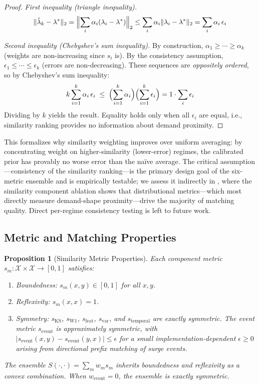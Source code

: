 \documentclass[conference,10pt]{IEEEtran}
\newtheorem{proposition}[theorem]{Proposition}
\begin{document}
\begin{proof}
\emph{First inequality (triangle inequality).}
\[
  \|\hat{\lambda}_k - \lambda^*\|_2
  = \Bigl\|\sum_{i} \alpha_i (\lambda_i - \lambda^*)\Bigr\|_2
  \leq \sum_{i} \alpha_i \|\lambda_i - \lambda^*\|_2
  = \sum_{i} \alpha_i \, \epsilon_i
\]

\emph{Second inequality (Chebyshev's sum inequality).}
By construction, $\alpha_1 \geq \cdots \geq \alpha_k$ (weights are
non-increasing since $s_i$ is). By the consistency assumption,
$\epsilon_1 \leq \cdots \leq \epsilon_k$ (errors are non-decreasing).
These sequences are \emph{oppositely ordered}, so by Chebyshev's sum
inequality:
\[
  k \sum_{i=1}^{k} \alpha_i \, \epsilon_i
  \;\leq\; \Bigl(\sum_{i=1}^{k} \alpha_i\Bigr)
           \Bigl(\sum_{i=1}^{k} \epsilon_i\Bigr)
  = 1 \cdot \sum_{i} \epsilon_i
\]
Dividing by $k$ yields the result. Equality holds only when all
$\epsilon_i$ are equal, i.e., similarity ranking provides no information
about demand proximity.
\end{proof}

This formalizes why similarity weighting improves over uniform averaging:
by concentrating weight on higher-similarity (lower-error) regimes, the
calibrated prior has provably no worse error than the na\"ive average.
The critical assumption---consistency of the similarity ranking---is the
primary design goal of the six-metric ensemble and is empirically
testable; we assess it indirectly in , where the
similarity component ablation shows that distributional metrics---which
most directly measure demand-shape proximity---drive the majority of
matching quality. Direct per-regime consistency testing is left to
future work.

\subsection{Metric and Matching Properties}

\begin{proposition}[Similarity Metric Properties]
\label{prop:metric_bounds}
Each component metric $s_m : \mathcal{X} \times \mathcal{X} \to [0, 1]$
satisfies:
\begin{enumerate}
  \item \emph{Boundedness}: $s_m(x, y) \in [0, 1]$ for all $x, y$.
  \item \emph{Reflexivity}: $s_m(x, x) = 1$.
  \item \emph{Symmetry}: $s_\text{KS}$, $s_\text{W1}$, $s_\text{feat}$,
    $s_\text{var}$, and $s_\text{temporal}$ are exactly symmetric.
    The event metric $s_\text{event}$ is approximately symmetric,
    with $|s_\text{event}(x,y) - s_\text{event}(y,x)| \leq \epsilon$
    for a small implementation-dependent $\epsilon \geq 0$ arising from
    directional prefix matching of surge events.
\end{enumerate}
The ensemble $S(\cdot, \cdot) = \sum_m w_m s_m$ inherits boundedness and
reflexivity as a convex combination. When $w_\text{event} = 0$, the
ensemble is exactly symmetric.
\end{proposition}
\end{document}
